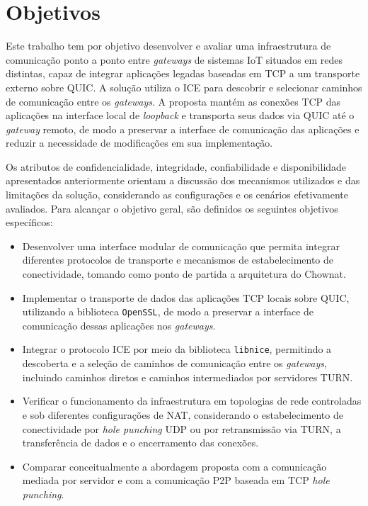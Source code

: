 \section{Objetivos}

Este trabalho tem por objetivo desenvolver e avaliar uma infraestrutura de comunicação ponto a ponto entre \textit{gateways} de sistemas IoT situados em redes distintas, capaz de integrar aplicações legadas baseadas em TCP a um transporte externo sobre QUIC. A solução utiliza o ICE para descobrir e selecionar caminhos de comunicação entre os \textit{gateways}. A proposta mantém as conexões TCP das aplicações na interface local de \textit{loopback} e transporta seus dados via QUIC até o \textit{gateway} remoto, de modo a preservar a interface de comunicação das aplicações e reduzir a necessidade de modificações em sua implementação.

Os atributos de confidencialidade, integridade, confiabilidade e disponibilidade apresentados anteriormente orientam a discussão dos mecanismos utilizados e das limitações da solução, considerando as configurações e os cenários efetivamente avaliados. Para alcançar o objetivo geral, são definidos os seguintes objetivos específicos:

\begin{itemize}
\item Desenvolver uma interface modular de comunicação que permita integrar diferentes protocolos de transporte e mecanismos de estabelecimento de conectividade, tomando como ponto de partida a arquitetura do Chownat.
\item Implementar o transporte de dados das aplicações TCP locais sobre QUIC, utilizando a biblioteca \texttt{OpenSSL}, de modo a preservar a interface de comunicação dessas aplicações nos \textit{gateways}.
\item Integrar o protocolo ICE por meio da biblioteca \texttt{libnice}, permitindo a descoberta e a seleção de caminhos de comunicação entre os \textit{gateways}, incluindo caminhos diretos e caminhos intermediados por servidores TURN.
\item Verificar o funcionamento da infraestrutura em topologias de rede controladas e sob diferentes configurações de NAT, considerando o estabelecimento de conectividade por \textit{hole punching} UDP ou por retransmissão via TURN, a transferência de dados e o encerramento das conexões.
\item Comparar conceitualmente a abordagem proposta com a comunicação mediada por servidor e com a comunicação P2P baseada em TCP \textit{hole punching}.
\end{itemize}

